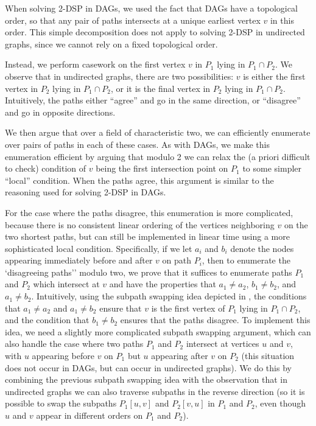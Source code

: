 \documentclass[11pt]{article}
\theoremstyle{definition}
\begin{document}
When solving \textsf{2-DSP} in DAGs, we used the fact that DAGs have a topological order, so that any pair of paths intersects at a unique earliest vertex $v$ in this order.
This simple decomposition does not apply to solving \textsf{2-DSP} in undirected graphs, since we cannot rely on a fixed topological order.

Instead, we perform casework on the first vertex $v$ in $P_1$ lying in $P_1\cap P_2$.
We observe that in undirected graphs, there are two possibilities: $v$ is either the first vertex in $P_2$ lying in $P_1\cap P_2$, or it is the final vertex in $P_2$ lying in $P_1\cap P_2$.
Intuitively, the paths either ``agree'' and go in the same direction, or ``disagree'' and go in opposite directions. 

We then argue that over a field of characteristic two, we can efficiently enumerate over pairs of paths in each of these cases.
As with DAGs, 
we make this enumeration efficient by arguing that modulo 2 we can relax the (a priori difficult to check) condition of $v$ being the first intersection point on $P_1$ to some simpler ``local'' condition.
When the paths agree, this argument is similar to the reasoning used for solving \textsf{2-DSP} in DAGs.

For the case where the paths disagree, this enumeration is  more complicated, because there is no consistent linear ordering of the vertices neighboring $v$ on the two shortest paths, but can still be implemented in linear time using a more sophisticated local condition.
Specifically, if we let $a_i$ and $b_i$ denote the nodes appearing immediately before and after $v$ on path $P_i$, then to enumerate the `disagreeing paths'' modulo two, we prove that it suffices to enumerate paths $P_1$ and $P_2$ which intersect at $v$ and have the properties that $a_1\neq a_2$, $b_1\neq b_2$, and $a_1\neq b_2$.
Intuitively, using the subpath swapping idea depicted in , the conditions that $a_1\neq a_2$ and $a_1\neq b_2$ ensure that $v$ is the first vertex of $P_1$ lying in $P_1\cap P_2$, and the condition that $b_1\neq b_2$  ensures that the paths disagree.
To implement this idea, we need a slightly more complicated subpath swapping argument, which can also handle the case where two paths $P_1$ and $P_2$ intersect at vertices $u$ and $v$, with $u$ appearing before $v$ on $P_1$ but $u$ appearing after $v$ on $P_2$ (this situation does not occur in DAGs, but can occur in undirected graphs).
We do this by combining the previous subpath swapping idea with the observation that in undirected graphs we can also traverse subpaths in the reverse direction (so it is possible to swap the subpaths $P_1[u,v]$ and $P_2[v,u]$ in $P_1$ and $P_2$, even though $u$ and $v$ appear in different orders on $P_1$ and $P_2$).
\end{document}
